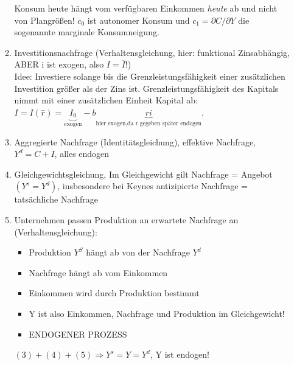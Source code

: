 \documentclass{scrartcl}
\begin{document}
\begin{enumerate}[(a)]
\begin{enumerate}[(1)]
  Konsum heute h\"{a}ngt vom verf\"{u}gbaren Einkommen \emph{heute} ab und nicht von Plangr\"{o}{\ss}en! $c_{0}$ ist autonomer Konsum und $c_1 = \partial C / \partial Y$ die sogenannte marginale Konsumneigung.\\
  \item Investitionsnachfrage (Verhaltensgleichung, hier: funktional Zinsabh\"{a}ngig, ABER i ist exogen, also $I=\overline{I}$!)\\
  Idee: Investiere solange bis die Grenzleistungsf\"{a}higkeit einer zus\"{a}tzlichen Investition gr\"{o}{\ss}er als der Zins ist. Grenzleistungsf\"{a}higkeit des Kapitals nimmt mit einer zus\"{a}tzlichen Einheit Kapital ab: $I=I(\overset{-}{r})=\underbrace{I_{0}}_\text{exogen} - b \underbrace{ri}_\text{hier exogen,da r gegeben sp\"{a}ter endogen}$.\\
  \item Aggregierte Nachfrage (Identit\"{a}tsgleichung), effektive Nachfrage, $Y^d = C+I$, alles endogen
  \item Gleichgewichtsgleichung, Im Gleichgewicht gilt Nachfrage = Angebot $(Y^s=Y^d)$, insbesondere bei Keynes antizipierte Nachfrage = tats\"{a}chliche Nachfrage
  \item Unternehmen passen Produktion an erwartete Nachfrage an (Verhaltensgleichung):
  \begin{itemize}
    \item Produktion $Y^S$ h\"{a}ngt ab von der Nachfrage $Y^d$
    \item Nachfrage h\"{a}ngt ab vom Einkommen
    \item Einkommen wird durch Produktion bestimmt
    \item Y ist also Einkommen, Nachfrage und Produktion im Gleichgewicht!
    \item ENDOGENER PROZESS
  \end{itemize}
  $(3)+(4)+(5) \Rightarrow Y^s=Y=Y^d$, Y ist endogen!
\end{enumerate}


\end{enumerate}
\end{document}
